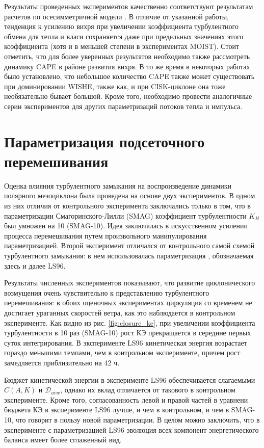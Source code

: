 \documentclass[12pt,a4paper]{report}
\begin{document}
Результаты проведенных экспериментов качественно соответствуют результатам расчетов по осесимметричной модели \citep{CraigGray1996, EmanuelRotunno1989}. В отличие от указанной работы, тенденция к усилению вихря при увеличении коэффициента турбулентного обмена для тепла и влаги сохраняется даже при предельных значениях этого коэффициента (хотя и в меньшей степени в экспериментах MOIST). Стоит отметить, что для более уверенных результатов необходимо также рассмотреть динамику CAPE в районе развития вихря. В то же время в некоторых работах было установлено, что небольшое количество CAPE также может существовать при доминировании WISHE, также как, и при CISK-циклоне она тоже необязательно бывает большой. Кроме того, необходимо провести аналогичные серии экспериментов для других параметризаций потоков тепла и импульса.

\section{Параметризация подсеточного перемешивания}
\label{sec:res:closure}

Оценка влияния турбулентного замыкания на воспроизведение динамики полярного мезоциклона была проведена на основе двух экспериментов. В одном из них отличия от контрольного эксперимента заключались только в том, что в параметризации Смагоринского-Лилли (SMAG) коэффициент турбулентности $K_H$ был умножен на 10 (SMAG-10). Идея заключалась в искусственном усилении процесса перемешивания путем произвольного манипулирования параметризацией. Второй эксперимент отличался от контрольного самой схемой турбулентного замыкания: в нем использовалась параметризация \citep{LupkesShluenzen1996,NohEtAl2003}, обозначаемая здесь и далее LS96.

Результаты численных экспериментов показывают, что развитие циклонического возмущения очень чувствительно к представлению турбулентного перемешивания: в обоих оценочных экспериментах циркуляция со временем не достигает ураганных скоростей ветра, как это наблюдается в контрольном эксперименте. Как видно из рис. \ref{fig:closure_ke}, при увеличении коэффициента турбулентности в 10 раз (SMAG-10) рост КЭ прекращается в середине первых суток интегрирования. В эксперименте LS96 кинетическая энергия возрастает гораздо меньшими темпами, чем в контрольном эксперименте, причем рост замедляется приблизительно на 42 ч.

Бюджет кинетической энергии в эксперименте LS96 обеспечивается слагаемыми $C(A,K)$ и $\mathcal{D}_{uvw}$, однако их вклад отличается от такового в контрольном эксперименте. Кроме того, согласованность левой и правой частей в уравнени бюджета КЭ в эксперименте LS96 лучше, и чем в контрольном, и чем в SMAG-10, что говорит в пользу новой параметризации. В целом можно заключить, что в эксперименте с параметризацией LS96 эволюция всех компонент энергетического баланса имеет более сглаженный вид.
\end{document}
